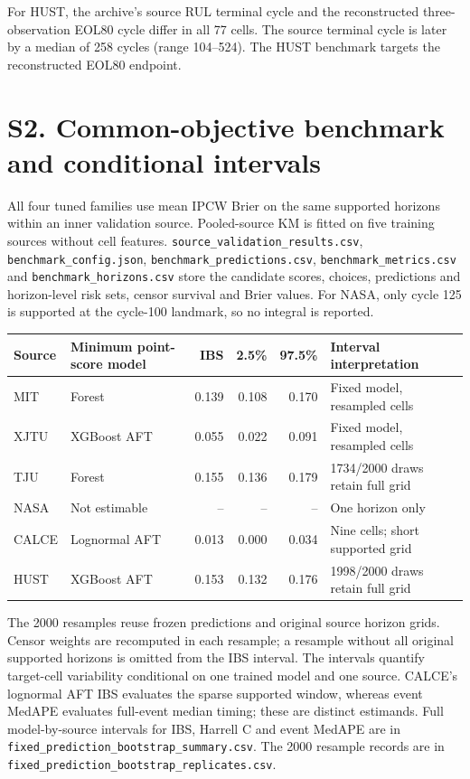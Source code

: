 \documentclass[10pt,a4paper]{article}
\begin{document}
For HUST, the archive's source RUL terminal cycle and the reconstructed three-observation EOL80 cycle differ in all 77 cells. The source terminal cycle is later by a median of 258 cycles (range 104--524). The HUST benchmark targets the reconstructed EOL80 endpoint.

\section*{S2. Common-objective benchmark and conditional intervals}
All four tuned families use mean IPCW Brier on the same supported horizons within an inner validation source. Pooled-source KM is fitted on five training sources without cell features. \texttt{source\_validation\_results.csv}, \texttt{benchmark\_config.json}, \texttt{benchmark\_predictions.csv}, \texttt{benchmark\_metrics.csv} and \texttt{benchmark\_horizons.csv} store the candidate scores, choices, predictions and horizon-level risk sets, censor survival and Brier values. For NASA, only cycle 125 is supported at the cycle-100 landmark, so no integral is reported.

\begin{center}\small
\begin{minipage}{\linewidth}\centering
{}\label{tab:S2}
\begin{tabular}{llrrrP{42mm}}
\toprule
Source & Minimum point-score model & IBS & 2.5\% & 97.5\% & Interval interpretation \\\midrule
MIT & Forest &0.139&0.108&0.170&Fixed model, resampled cells\\
XJTU & XGBoost AFT &0.055&0.022&0.091&Fixed model, resampled cells\\
TJU & Forest &0.155&0.136&0.179&1734/2000 draws retain full grid\\
NASA & Not estimable &--&--&--&One horizon only\\
CALCE & Lognormal AFT &0.013&0.000&0.034&Nine cells; short supported grid\\
HUST & XGBoost AFT &0.153&0.132&0.176&1998/2000 draws retain full grid\\\bottomrule
\end{tabular}
\end{minipage}
\end{center}
The 2000 resamples reuse frozen predictions and original source horizon grids. Censor weights are recomputed in each resample; a resample without all original supported horizons is omitted from the IBS interval. The intervals quantify target-cell variability conditional on one trained model and one source. CALCE's lognormal AFT IBS evaluates the sparse supported window, whereas event MedAPE evaluates full-event median timing; these are distinct estimands. Full model-by-source intervals for IBS, Harrell C and event MedAPE are in \texttt{fixed\_prediction\_bootstrap\_summary.csv}. The 2000 resample records are in \texttt{fixed\_prediction\_bootstrap\_replicates.csv}.
\end{document}
